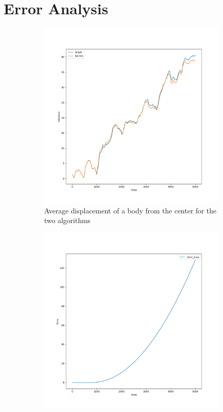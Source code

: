 \documentclass[12pt]{article}
\begin{document}
\section{Error Analysis}

\begin{figure}[hbt!]
    \centering
    \begin{subfigure}[b]{0.49\textwidth}
        \centering
        \includegraphics[width=\textwidth]{images/distance.png}
        \caption{Average displacement of a body from the center for the two algorithms}
        \label{figure:trajectory}
    \end{subfigure}
    \hfill
    \begin{subfigure}[b]{0.49\textwidth}
        \centering
        \includegraphics[width=\textwidth]{images/error_max.png}

\end{subfigure}
\end{figure}
\end{document}
